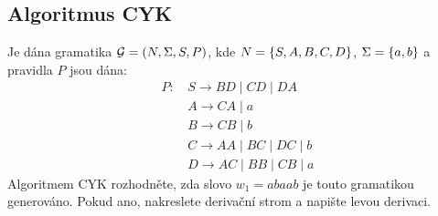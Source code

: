 
\subsection{Algoritmus CYK} %
Je dána gramatika $\mathcal{G} = (N, \Sigma, S, P)$, kde
$N = \left\lbrace S, A, B, C, D \right\rbrace$, $\Sigma = \left\lbrace a, b \right\rbrace$ a pravidla $P$ jsou dána:
\begin{align*}
    P \text{: } & S \rightarrow BD \mid CD \mid DA \\
       & A \rightarrow CA \mid a \\
       & B \rightarrow CB \mid b \\
       & C \rightarrow AA \mid BC \mid DC \mid b \\
       & D \rightarrow AC \mid BB \mid CB \mid a
\end{align*}
Algoritmem CYK rozhodněte, zda slovo $w_1 = abaab$ je touto gramatikou generováno. Pokud ano, nakreslete derivační strom
a napište levou derivaci.

